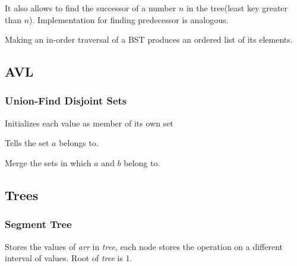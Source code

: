 \documentclass[12pt]{article}
\begin{document}
\noindent\begin{minipage}{\linewidth}

\end{minipage}
It also allows to find the successor of a number $n$ in the tree(least key
greater than $n$). Implementation for finding predecessor is analogous.\\

\noindent\begin{minipage}{\linewidth}

\end{minipage}
Making an in-order traversal of a BST produces an ordered list of its
elements.\\

\subsection{AVL} 
\subsubsection{Union-Find Disjoint Sets}
\noindent\begin{minipage}{\linewidth}

\end{minipage}
Initializes each value as member of its own set

\noindent\begin{minipage}{\linewidth}

\end{minipage}
Tells the set $a$ belongs to.

\noindent\begin{minipage}{\linewidth}

\end{minipage}
Merge the sets in which $a$ and $b$ belong to.

\subsection{Trees}
\subsubsection{Segment Tree}

\noindent\begin{minipage}{\linewidth}

\end{minipage}
Stores the values of \textit{arr} in \textit{tree}, each node stores the
operation on a different interval of values. Root of \textit{tree} is 1.
\end{document}
